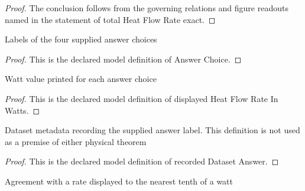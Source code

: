 \begin{proof}
  The conclusion follows from the governing relations and figure readouts named in the statement of total Heat Flow Rate exact.
\end{proof}
\begin{definition}
  \label{def:physics:phyx-mini-0467:phyxminiproblems-problemphyxmini0467-answerchoice}
  Labels of the four supplied answer choices
\end{definition}
\begin{proof}
  This is the declared model definition of Answer Choice.
\end{proof}
\begin{definition}
  \label{def:physics:phyx-mini-0467:phyxminiproblems-problemphyxmini0467-displayedheatflowrateinwatts}
  Watt value printed for each answer choice
\end{definition}
\begin{proof}
  This is the declared model definition of displayed Heat Flow Rate In Watts.
\end{proof}
\begin{definition}
  \label{def:physics:phyx-mini-0467:phyxminiproblems-problemphyxmini0467-recordeddatasetanswer}
  Dataset metadata recording the supplied answer label. This definition is not used as a premise of either physical theorem
\end{definition}
\begin{proof}
  This is the declared model definition of recorded Dataset Answer.
\end{proof}
\begin{definition}
  \label{def:physics:phyx-mini-0467:phyxminiproblems-problemphyxmini0467-roundstodisplayedtenthwatt}
  Agreement with a rate displayed to the nearest tenth of a watt
\end{definition}
